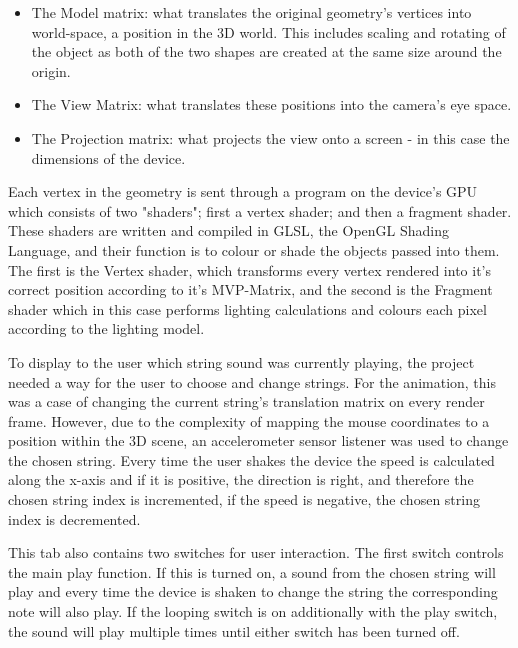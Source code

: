 \documentclass[conference]{acmsiggraph}
\begin{document}
\begin{itemize}
	\item The Model matrix: what translates the original geometry's vertices into world-space, a position in the 3D world. This includes scaling and rotating of the object as both of the two shapes are created at the same size around the origin.
	\item The View Matrix: what translates these positions into the camera's eye space.
	\item The Projection matrix: what projects the view onto a screen - in this case the dimensions of the device.
	
\end{itemize}

Each vertex in the geometry is sent through a program on the device's GPU which consists of two "shaders"; first a vertex shader; and then a fragment shader. These shaders are written and compiled in GLSL, the OpenGL Shading Language, and their function is to colour or shade the objects passed into them. The first is the Vertex shader, which transforms every vertex rendered into it's correct position according to it's MVP-Matrix, and the second is the Fragment shader which in this case performs lighting calculations and colours each pixel according to the lighting model.

To display to the user which string sound was currently playing, the project needed a way for the user to choose and change strings. For the animation, this was a case of changing the current string's translation matrix on every render frame. However, due to the complexity of mapping the mouse coordinates to a position within the 3D scene, an accelerometer sensor listener was used to change the chosen string. Every time the user shakes the device the speed is calculated along the x-axis and if it is positive, the direction is right, and therefore the chosen string index is incremented, if the speed is negative, the chosen string index is decremented.

This tab also contains two switches for user interaction. The first switch controls the main play function. If this is turned on, a sound from the chosen string will play and every time the device is shaken to change the string the corresponding note will also play. If the looping switch is on additionally with the play switch, the sound will play multiple times until either switch has been turned off. 
\end{document}
